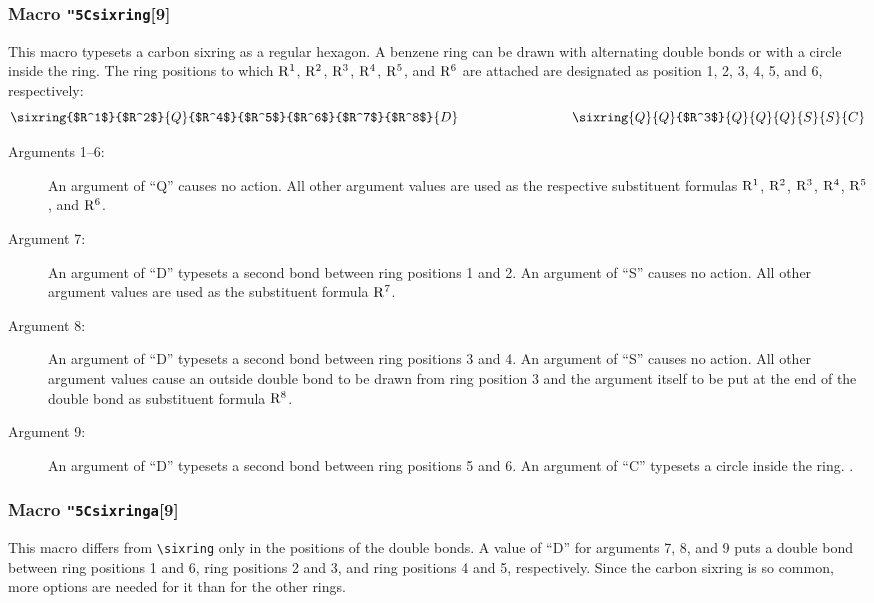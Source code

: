\subsubsection{Macro {\tt\char"5C{}sixring}[9]}
  This macro typesets a carbon sixring as a regular hexagon.
 A benzene ring can be drawn with alternating double bonds or
 with a circle inside the ring. The ring positions to which
 ${\rm R^1}$, ${\rm R^2}$, ${\rm R^3}$, ${\rm R^4}$, ${\rm R^5}$,
 and ${\rm R^6}$ are attached are designated as position
 1, 2, 3, 4, 5, and 6, respectively:
 \[ \sixring{$R^1$}{$R^2$}{Q}{$R^4$}{$R^5$}{$R^6$}{$R^7$}{$R^8$}{D}
    \hspace{3cm}
    \sixring{Q}{Q}{$R^3$}{Q}{Q}{Q}{S}{S}{C}  \]
 
 \begin{description}
 \item[{\rm Arguments 1--6:}] An argument of ``Q'' causes
      no action. All other argument values are used as the respective
      substituent formulas ${\rm R^1}$, ${\rm R^2}$, ${\rm R^3}$,
      ${\rm R^4}$, ${\rm R^5}$, and ${\rm R^6}$.
 \item[{\rm Argument 7:}] An argument of ``D'' typesets
      a second bond between ring positions 1 and 2. An argument
      of ``S'' causes no action. All other argument values are
      used as the substituent formula ${\rm R^7}$.
 \item[{\rm Argument 8:}] An argument of ``D'' typesets
      a second bond between ring positions 3 and 4. An argument
      of ``S'' causes no action. All other argument values cause
      an outside double bond to be drawn from ring position 3
      and the argument itself to be put at the end of the double
      bond as substituent formula ${\rm R^8}$.
 \item[{\rm Argument 9:}] An argument of ``D'' typesets
      a second bond between ring positions 5 and 6. An argument
      of ``C'' typesets a circle inside the ring. \ru .
 \end{description}
 
\subsubsection{Macro {\tt\char"5C{}sixringa}[9]}
  This macro differs from \verb+\sixring+ only in the positions
 of the double bonds. A value of ``D'' for arguments 7, 8, and 9
 puts a double bond between ring positions 1 and 6, ring positions
 2 and 3, and ring positions 4 and 5, respectively.
 Since the carbon sixring is so common, more options are needed
 for it than for the other rings.
 

